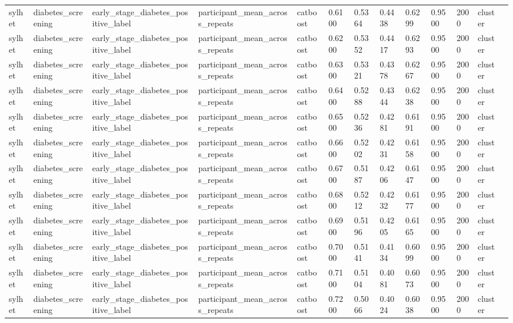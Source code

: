 \begin{tabular}{lllllllllllll}
sylhet & diabetes\_screening & early\_stage\_diabetes\_positive\_label & participant\_mean\_across\_repeats & catboost & 0.6100 & 0.5364 & 0.4438 & 0.6299 & 0.9500 & 2000 & cluster &  \\
sylhet & diabetes\_screening & early\_stage\_diabetes\_positive\_label & participant\_mean\_across\_repeats & catboost & 0.6200 & 0.5352 & 0.4417 & 0.6293 & 0.9500 & 2000 & cluster &  \\
sylhet & diabetes\_screening & early\_stage\_diabetes\_positive\_label & participant\_mean\_across\_repeats & catboost & 0.6300 & 0.5321 & 0.4378 & 0.6267 & 0.9500 & 2000 & cluster &  \\
sylhet & diabetes\_screening & early\_stage\_diabetes\_positive\_label & participant\_mean\_across\_repeats & catboost & 0.6400 & 0.5288 & 0.4344 & 0.6238 & 0.9500 & 2000 & cluster &  \\
sylhet & diabetes\_screening & early\_stage\_diabetes\_positive\_label & participant\_mean\_across\_repeats & catboost & 0.6500 & 0.5236 & 0.4281 & 0.6191 & 0.9500 & 2000 & cluster &  \\
sylhet & diabetes\_screening & early\_stage\_diabetes\_positive\_label & participant\_mean\_across\_repeats & catboost & 0.6600 & 0.5202 & 0.4231 & 0.6158 & 0.9500 & 2000 & cluster &  \\
sylhet & diabetes\_screening & early\_stage\_diabetes\_positive\_label & participant\_mean\_across\_repeats & catboost & 0.6700 & 0.5187 & 0.4206 & 0.6147 & 0.9500 & 2000 & cluster &  \\
sylhet & diabetes\_screening & early\_stage\_diabetes\_positive\_label & participant\_mean\_across\_repeats & catboost & 0.6800 & 0.5212 & 0.4232 & 0.6177 & 0.9500 & 2000 & cluster &  \\
sylhet & diabetes\_screening & early\_stage\_diabetes\_positive\_label & participant\_mean\_across\_repeats & catboost & 0.6900 & 0.5196 & 0.4205 & 0.6165 & 0.9500 & 2000 & cluster &  \\
sylhet & diabetes\_screening & early\_stage\_diabetes\_positive\_label & participant\_mean\_across\_repeats & catboost & 0.7000 & 0.5141 & 0.4134 & 0.6099 & 0.9500 & 2000 & cluster &  \\
sylhet & diabetes\_screening & early\_stage\_diabetes\_positive\_label & participant\_mean\_across\_repeats & catboost & 0.7100 & 0.5104 & 0.4081 & 0.6073 & 0.9500 & 2000 & cluster &  \\
sylhet & diabetes\_screening & early\_stage\_diabetes\_positive\_label & participant\_mean\_across\_repeats & catboost & 0.7200 & 0.5066 & 0.4024 & 0.6038 & 0.9500 & 2000 & cluster &  \\

\end{tabular}
